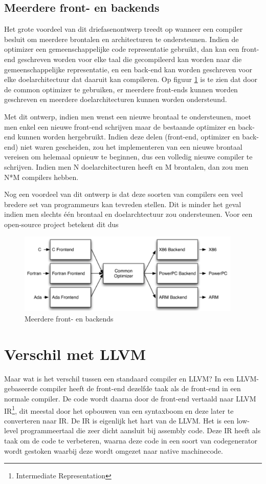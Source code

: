 \subsection{Meerdere front- en backends}
Het grote voordeel van dit driefasenontwerp treedt op wanneer een compiler besluit om meerdere brontalen en architecturen te ondersteunen. Indien de optimizer een gemeenschappelijke code representatie gebruikt, dan kan een front-end geschreven worden voor elke taal die gecompileerd kan worden naar die gemeenschappelijke representatie, en een back-end kan worden geschreven voor elke doelarchitectuur dat daaruit kan compileren. Op figuur \ref{fig:llvmdriefasen} is te zien dat door de common optimizer te gebruiken, er meerdere front-ends kunnen worden geschreven en meerdere doelarchitecturen kunnen worden ondersteund.

Met dit ontwerp, indien men wenst een nieuwe brontaal te ondersteunen, moet men enkel een nieuwe front-end schrijven maar de bestaande optimizer en back-end kunnen worden hergebruikt. Indien deze delen (front-end, optimizer en back-end) niet waren gescheiden, zou het implementeren van een nieuwe brontaal vereisen om helemaal opnieuw te beginnen, dus een volledig nieuwe compiler te schrijven. Indien men N doelarchitecturen heeft en M brontalen, dan zou men N*M compilers hebben.

Nog een voordeel van dit ontwerp is dat deze soorten van compilers een veel bredere set van programmeurs kan tevreden stellen. Dit is minder het geval indien men slechts één brontaal en doelarchtectuur zou ondersteunen. Voor een open-source project betekent dit dus 

\begin{figure} [ht]
	\centering
	\includegraphics[width=0.95\textwidth]{img/llvmdriefasen}
	\caption{Meerdere front- en backends}
	\label{fig:llvmdriefasen}
\end{figure}

\section{Verschil met LLVM}
Maar wat is het verschil tussen een standaard compiler en LLVM? 
\newline
In een LLVM-gebaseerde compiler heeft de front-end dezelfde taak als de front-end in een normale compiler. De code wordt daarna door de front-end vertaald naar LLVM IR\footnote{Intermediate Representation}, dit meestal door het opbouwen van een syntaxboom en deze later te converteren naar IR. De IR is eigenlijk het hart van de LLVM. Het is een low-level programmeertaal die zeer dicht aansluit bij assembly code. Deze IR heeft als taak om de code te verbeteren, waarna deze code in een soort van codegenerator wordt gestoken waarbij deze wordt omgezet naar native machinecode. 

